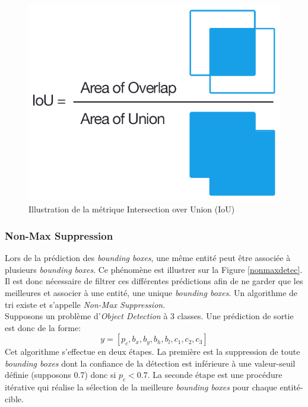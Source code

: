 \begin{figure}
    \centering
    \includegraphics[scale=0.3]{./tex/computer-vision/object-recognition/iou.png}
    \caption{Illustration de la métrique Intersection over Union (IoU)}
    \label{iouim}
\end{figure}

\subsubsection{Non-Max Suppression}
Lors de la prédiction des \textit{bounding boxes}, une même entité peut être associée à plusieurs \textit{bounding boxes}. Ce phénomène est illustrer sur la Figure \ref{nonmaxdetec}. Il est donc nécessaire de filtrer ces différentes prédictions afin de ne garder que les meilleures et associer à une entité, une unique \textit{bounding boxes}. Un algorithme de tri existe et s'appelle \textit{Non-Max Suppression}.\\

\noindent Supposons un problème d'\textit{Object Detection} à 3 classes. Une prédiction de sortie est donc de la forme:
$$y=[p_c, b_x,b_y,b_h,b_l,c_1,c_2,c_3]$$
\noindent Cet algorithme s'effectue en deux étapes. La première est la suppression de toute \textit{bounding boxes} dont la confiance de la détection est inférieure à une valeur-seuil définie (supposons 0.7) donc si $p_c < 0.7$. La seconde étape est une procédure itérative qui réalise la sélection de la meilleure \textit{bounding boxes} pour chaque entité-cible.\\

